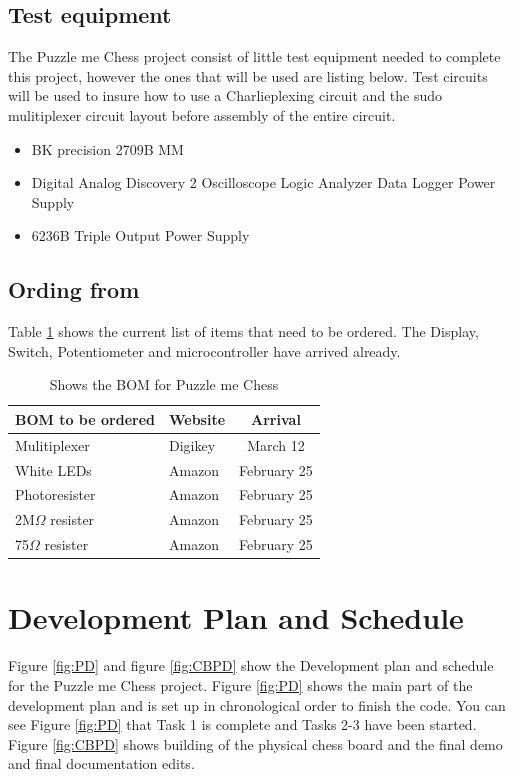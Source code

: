 \documentclass[11pt]{article}
\begin{document}
\subsection{Test equipment}
The Puzzle me Chess project consist of little test equipment needed to complete this project, however the ones that will be used are listing below. Test circuits will be used to insure how to use a Charlieplexing circuit and the sudo mulitiplexer circuit layout before assembly of the entire circuit. 
\begin{itemize}
\item BK precision 2709B MM
\item Digital Analog Discovery 2
\subitem Oscilloscope
\subitem Logic Analyzer
\subitem Data Logger
\subitem Power Supply
\item 6236B Triple Output Power Supply 

\end{itemize}

\subsection{Ording from}
Table \ref{tab:ording} shows the current list of items that need to be ordered. The Display, Switch, Potentiometer and microcontroller have arrived already. 
\begin{table} 
\begin{center}
    \begin{tabular}{| l | l | c |}
    \hline
    BOM to be ordered  & Website & Arrival \\ \hline
    Mulitiplexer & Digikey & March 12 \\ \hline 
    White LEDs & Amazon & February 25 \\ \hline
    Photoresister & Amazon & February 25 \\ \hline
    2M$\Omega$ resister & Amazon & February 25 \\ \hline
    75$\Omega$ resister & Amazon  & February 25 \\ \hline
    \end{tabular}
    \caption{Shows the BOM for Puzzle me Chess}
	\label{tab:ording}
\end{center}
\end{table}

\section{Development Plan and Schedule}
Figure \ref{fig:PD} and figure \ref{fig:CBPD} show the Development plan and schedule for the Puzzle me Chess project. Figure \ref{fig:PD} shows the main part of the development plan and is set up in chronological order to finish the code. You can see Figure \ref{fig:PD} that Task 1 is complete and Tasks 2-3 have been started. Figure \ref{fig:CBPD} shows building of the physical chess board and the final demo and final documentation edits. 
\end{document}
